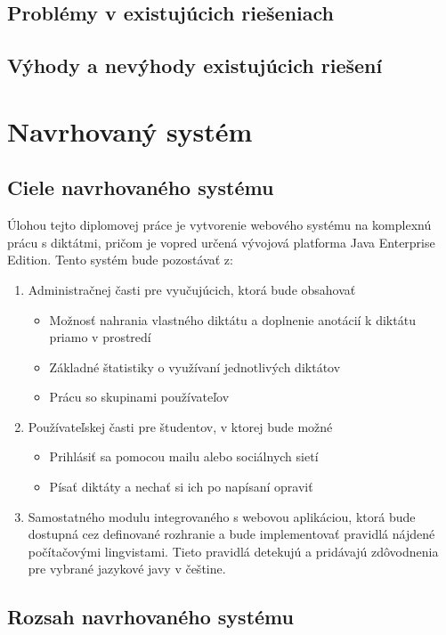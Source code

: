 \documentclass[12pt,oneside]{fithesis2}
\begin{document}
       		\subsection{Problémy v existujúcich riešeniach}
       		\subsection{Výhody a nevýhody existujúcich riešení}
       \section{Navrhovaný systém}
       		\subsection{Ciele navrhovaného systému} \label{spec-app}
       		
Úlohou tejto diplomovej práce je vytvorenie webového systému na komplexnú prácu s diktátmi, pričom je vopred určená vývojová platforma Java Enterprise Edition. Tento systém bude pozostávať z:

\begin{enumerate}
\item Administračnej časti pre vyučujúcich, ktorá bude obsahovať
	\begin{itemize}
	\item Možnosť nahrania vlastného diktátu a doplnenie anotácií k diktátu priamo v prostredí
	\item Základné štatistiky o využívaní jednotlivých diktátov
	\item Prácu so skupinami používateľov
	\end{itemize}
\item Používateľskej časti pre študentov, v ktorej bude možné
	\begin{itemize}
	\item Prihlásiť sa pomocou mailu alebo sociálnych sietí
	\item Písať diktáty a nechať si ich po napísaní opraviť
	\end{itemize}
\item Samostatného modulu integrovaného s webovou aplikáciou, ktorá bude dostupná cez definované rozhranie a bude implementovať pravidlá nájdené počítačovými lingvistami. Tieto pravidlá detekujú a pridávajú zdôvodnenia pre vybrané jazykové javy v češtine.
\end{enumerate}
       		
       		\subsection{Rozsah navrhovaného systému}
\end{document}

